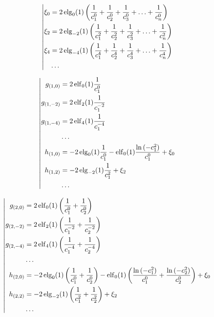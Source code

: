 \begin{equation*} \left| \begin{aligned}
\xi_0 &= 2 \elg_0(1) \left(
  \frac{1}{c_1^0}
+ \frac{1}{c_2^0}
+ \frac{1}{c_3^0}
+ \ldots
+ \frac{1}{c_n^0} \right) \\
%
\xi_2 &= 2 \elg_{-2}(1) \left(
  \frac{1}{c_1^2}
+ \frac{1}{c_2^2}
+ \frac{1}{c_3^2}
+ \ldots
+ \frac{1}{c_n^2} \right) \\
%
\xi_4 &= 2 \elg_{-4}(1) \left(
  \frac{1}{c_1^4}
+ \frac{1}{c_2^4}
+ \frac{1}{c_3^4}
+ \ldots
+ \frac{1}{c_n^4} \right) \\
%
&\ldots \\
\end{aligned} \right. \end{equation*}

\begin{equation*} \left| \begin{aligned}
g_{(1,0)} &=
  2 \elf_0(1) \frac{1}{c_1^0} \\
%
g_{(1,-2)} &=
  2 \elf_2(1) \frac{1}{c_1^{-2}} \\
%
g_{(1,-4)} &=
  2 \elf_4(1) \frac{1}{c_1^{-4}} \\
%
&\ldots \\
%
h_{(1,0)} &=
- 2 \elg_0(1) \frac{1}{c_1^0}
- \elf_0(1) \frac{\ln{(-c_1^2)}}{c_1^0}
+ \xi_0 \\
%
h_{(1,2)} &=
- 2 \elg_{-2}(1) \frac{1}{c_1^2}
+ \xi_2 \\
%
&\ldots \\
\end{aligned} \right. \end{equation*}

\begin{equation*} \left| \begin{aligned}
g_{(2,0)} &=
  2 \elf_0(1) \left(
  \frac{1}{c_1^0}
+ \frac{1}{c_2^0} \right) \\
%
g_{(2,-2)} &=
  2 \elf_2(1) \left(
  \frac{1}{c_1^{-2}}
+ \frac{1}{c_2^{-2}} \right) \\
%
g_{(2,-4)} &=
  2 \elf_4(1) \left(
  \frac{1}{c_1^{-4}}
+ \frac{1}{c_2^{-4}} \right) \\
%
&\ldots \\
%
h_{(2,0)} &=
- 2 \elg_0(1) \left(
  \frac{1}{c_1^0}
+ \frac{1}{c_2^0} \right)
- \elf_0(1) \left(
  \frac{\ln{(-c_1^2)}}{c_1^0}
+ \frac{\ln{(-c_2^2)}}{c_2^0} \right)
+ \xi_0 \\
%
h_{(2,2)} &=
- 2 \elg_{-2}(1) \left(
  \frac{1}{c_1^2}
+ \frac{1}{c_2^2} \right)
+ \xi_2 \\
%
&\ldots \\
\end{aligned} \right. \end{equation*}


